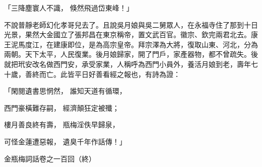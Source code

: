 「三降塵寰人不識，  倏然飛過岱東峰！」

不說普靜老師幻化孝哥兒去了。且說吳月娘與吳二舅眾人，在永福寺住了那到十日光景，果然大金國立了張邦昌在東京稱帝，置文武百官。徽宗、欽完兩君北去。康王泥馬度江，在建康即位，是為高宗皇帝。拜宗澤為大將，復取山東、河北，分為兩朝。天下太平，人民復業。後月娘歸家，開了門戶，家產器物，都不曾疏失。後就把玳安改名做西門安，承受家業，人稱呼為西門小員外，養活月娘到老，壽年七十歲，善終而亡。此皆平日好善看經之報也，有詩為證：

「閑閱遺書思惘然，  誰知天道有循環，

西門豪橫難存嗣，  經濟顛狂定被殲；

樓月善良終有壽，  瓶梅淫佚早歸泉，

可怪金蓮遭惡報，  遺臭千年作話傳！」

金瓶梅詞話卷之一百回（終）


